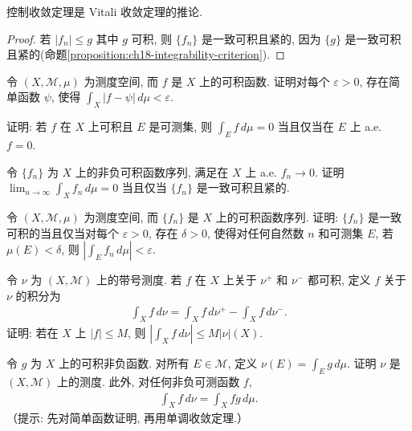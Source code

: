 \documentclass[../../main.tex]{subfiles}
\begin{document}
\begin{corollary}\label{corollary:ch18-vitali-to-dct}
控制收敛定理是 Vitali 收敛定理的推论.
\end{corollary}

\begin{proof}
若 $|f_{n}|\leqslant g$ 其中 $g$ 可积, 则 $\{f_{n}\}$ 是一致可积且紧的, 因为 $\{g\}$ 是一致可积且紧的(命题\cref{proposition:ch18-integrability-criterion}).
\end{proof}

\begin{exercise}\label{exercise:ch18-23}
令 $(X,\mathcal{M},\mu)$ 为测度空间, 而 $f$ 是 $X$ 上的可积函数. 证明对每个 $\varepsilon>0$, 存在简单函数 $\psi$, 使得 $\int_{X}|f-\psi|\,d\mu<\varepsilon$.
\end{exercise}

\begin{exercise}\label{exercise:ch18-24}
证明: 若 $f$ 在 $X$ 上可积且 $E$ 是可测集, 则 $\int_{E}f\,d\mu=0$ 当且仅当在 $E$ 上 a.e. $f=0$.
\end{exercise}

\begin{exercise}\label{exercise:ch18-25}
令 $\{f_{n}\}$ 为 $X$ 上的非负可积函数序列, 满足在 $X$ 上 a.e. $f_{n}\to 0$. 证明 $\lim_{n\to\infty}\int_{X}f_{n}\,d\mu=0$ 当且仅当 $\{f_{n}\}$ 是一致可积且紧的.
\end{exercise}

\begin{exercise}\label{exercise:ch18-26}
令 $(X,\mathcal{M},\mu)$ 为测度空间, 而 $\{f_{n}\}$ 是 $X$ 上的可积函数序列. 证明: $\{f_{n}\}$ 是一致可积的当且仅当对每个 $\varepsilon>0$, 存在 $\delta>0$, 使得对任何自然数 $n$ 和可测集 $E$, 若 $\mu(E)<\delta$, 则 $\left|\int_{E}f_{n}\,d\mu\right|<\varepsilon$.
\end{exercise}

\begin{exercise}\label{exercise:ch18-27}
令 $\nu$ 为 $(X,\mathcal{M})$ 上的带号测度. 若 $f$ 在 $X$ 上关于 $\nu^{+}$ 和 $\nu^{-}$ 都可积, 定义 $f$ 关于 $\nu$ 的积分为
\begin{align*}
\int_{X}f\,d\nu=\int_{X}f\,d\nu^{+}-\int_{X}f\,d\nu^{-}.
\end{align*}
证明: 若在 $X$ 上 $|f|\leqslant M$, 则 $\left|\int_{X}f\,d\nu\right|\leqslant M|\nu|(X)$.
\end{exercise}

\begin{exercise}\label{exercise:ch18-28}
令 $g$ 为 $X$ 上的可积非负函数. 对所有 $E\in\mathcal{M}$, 定义 $\nu(E)=\int_{E}g\,d\mu$. 证明 $\nu$ 是 $(X,\mathcal{M})$ 上的测度. 此外, 对任何非负可测函数 $f$,
\begin{align*}
\int_{X}f\,d\nu=\int_{X}fg\,d\mu.
\end{align*}
（提示: 先对简单函数证明, 再用单调收敛定理.）
\end{exercise}
\end{document}
